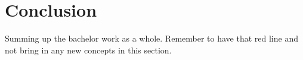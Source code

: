 \section{Conclusion}
Summing up the bachelor work as a whole. Remember to have that red line and not bring in any new concepts in this section. 